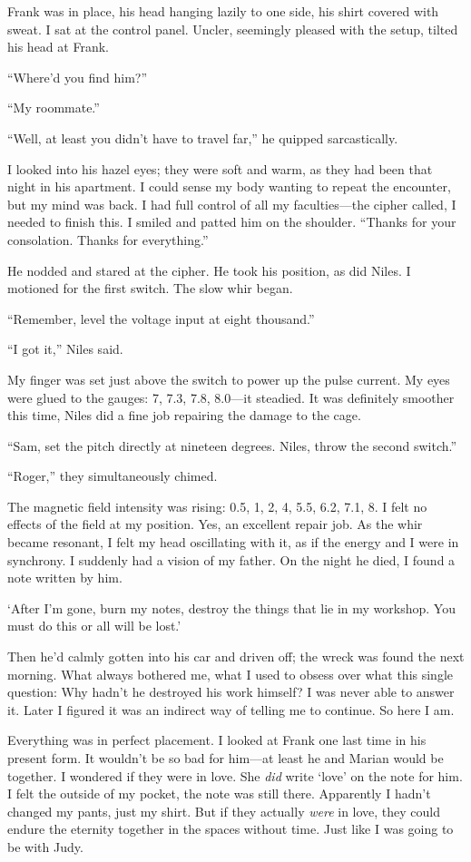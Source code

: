 Frank was in place, his head hanging lazily to one side, his shirt
covered with sweat. I sat at the control panel. Uncler, seemingly
pleased with the setup, tilted his head at Frank.

``Where'd you find him?''

``My roommate.''

``Well, at least you didn't have to travel far,'' he quipped
sarcastically.

I looked into his hazel eyes; they were soft and warm, as they had been
that night in his apartment. I could sense my body wanting to repeat the
encounter, but my mind was back. I had full control of all my
faculties---the cipher called, I needed to finish this. I smiled and
patted him on the shoulder. ``Thanks for your consolation. Thanks for
everything.''

He nodded and stared at the cipher. He took his position, as did Niles.
I motioned for the first switch. The slow whir began.

``Remember, level the voltage input at eight thousand.''

``I got it,'' Niles said.

My finger was set just above the switch to power up the pulse current.
My eyes were glued to the gauges: 7, 7.3, 7.8, 8.0---it steadied. It was
definitely smoother this time, Niles did a fine job repairing the damage
to the cage.

``Sam, set the pitch directly at nineteen degrees. Niles, throw the
second switch.''

``Roger,'' they simultaneously chimed.

The magnetic field intensity was rising: 0.5, 1, 2, 4, 5.5, 6.2, 7.1, 8.
I felt no effects of the field at my position. Yes, an excellent repair
job. As the whir became resonant, I felt my head oscillating with it, as
if the energy and I were in synchrony. I suddenly had a vision of my
father. On the night he died, I found a note written by him.

`After I'm gone, burn my notes, destroy the things that lie in my
workshop. You must do this or all will be lost.'

Then he'd calmly gotten into his car and driven off; the wreck was found
the next morning. What always bothered me, what I used to obsess over
what this single question: Why hadn't he destroyed his work himself? I
was never able to answer it. Later I figured it was an indirect way of
telling me to continue. So here I am.

Everything was in perfect placement. I looked at Frank one last time in
his present form. It wouldn't be so bad for him---at least he and Marian
would be together. I wondered if they were in love. She \emph{did} write
`love' on the note for him. I felt the outside of my pocket, the note
was still there. Apparently I hadn't changed my pants, just my shirt.
But if they actually \emph{were} in love, they could endure the eternity
together in the spaces without time. Just like I was going to be with
Judy.

